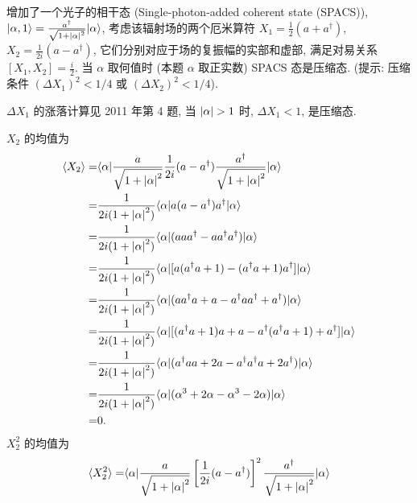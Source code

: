 \documentclass{assignment}
\begin{document}
\begin{prob}
    增加了一个光子的相干态 (Single-photon-added coherent state (SPACS)), $\lvert\alpha,1\rangle=\frac{a^{\dagger}}{\sqrt{1+\left\lvert\alpha\right\rvert^2}}\lvert\alpha\rangle$, 考虑该辐射场的两个厄米算符 $X_1=\frac{1}{2}(a+a^{\dagger})$, $X_2=\frac{1}{2i}(a-a^{\dagger})$, 它们分别对应于场的复振幅的实部和虚部, 满足对易关系 $[X_1,X_2]=\frac{i}{2}$. 当 $\alpha$ 取何值时 (本题 $\alpha$ 取正实数) SPACS 态是压缩态. (提示: 压缩条件 $(\Delta X_1)^2<1/4$ 或 $(\Delta X_2)^2<1/4$).
\end{prob}
\begin{sol}
    $\Delta X_1$ 的涨落计算见 2011 年第 4 题, 当 $\left\lvert\alpha\right\rvert>1$ 时, $\Delta X_1<1$, 是压缩态.

    $X_2$ 的均值为
    \begin{align}
        \notag\langle X_2\rangle=&\langle\alpha\rvert\frac{a}{\sqrt{1+\left\lvert\alpha\right\rvert^2}}\frac{1}{2i}(a-a^{\dagger})\frac{a^{\dagger}}{\sqrt{1+\left\lvert\alpha\right\rvert^2}}\lvert\alpha\rangle\\
        \notag=&\frac{1}{2i(1+\left\lvert\alpha\right\rvert^2)}\langle\alpha\rvert a(a-a^{\dagger})a^{\dagger}\lvert\alpha\rangle\\
        \notag=&\frac{1}{2i(1+\left\lvert\alpha\right\rvert^2)}\langle\alpha\rvert(aaa^{\dagger}-aa^{\dagger}a^{\dagger})\lvert\alpha\rangle\\
        \notag=&\frac{1}{2i(1+\left\lvert\alpha\right\rvert^2)}\langle\alpha\rvert[a(a^{\dagger}a+1)-(a^{\dagger}a+1)a^{\dagger}]\lvert\alpha\rangle\\
        \notag=&\frac{1}{2i(1+\left\lvert\alpha\right\rvert^2)}\langle\alpha\rvert(aa^{\dagger}a+a-a^{\dagger}aa^{\dagger}+a^{\dagger})\lvert\alpha\rangle\\
        \notag=&\frac{1}{2i(1+\left\lvert\alpha\right\rvert^2)}\langle\alpha\rvert[(a^{\dagger}a+1)a+a-a^{\dagger}(a^{\dagger}a+1)+a^{\dagger}]\lvert\alpha\rangle\\
        \notag=&\frac{1}{2i(1+\left\lvert\alpha\right\rvert^2)}\langle\alpha\rvert(a^{\dagger}aa+2a-a^{\dagger}a^{\dagger}a+2a^{\dagger})\lvert\alpha\rangle\\
        \notag=&\frac{1}{2i(1+\left\lvert\alpha\right\rvert^2)}\langle\alpha\rvert(\alpha^3+2\alpha-\alpha^3-2\alpha)\lvert\alpha\rangle\\
        =&0.
    \end{align}
    $X_2^2$ 的均值为
    \begin{align}
        \notag\langle X_2^2\rangle=&\langle\alpha\rvert\frac{a}{\sqrt{1+\abs{\alpha}^2}}\left[\frac{1}{2i}(a-a^{\dagger})\right]^2\frac{a^{\dagger}}{\sqrt{1+\abs{\alpha}^2}}\lvert\alpha\rangle\\

\end{align}
\end{sol}
\end{document}
